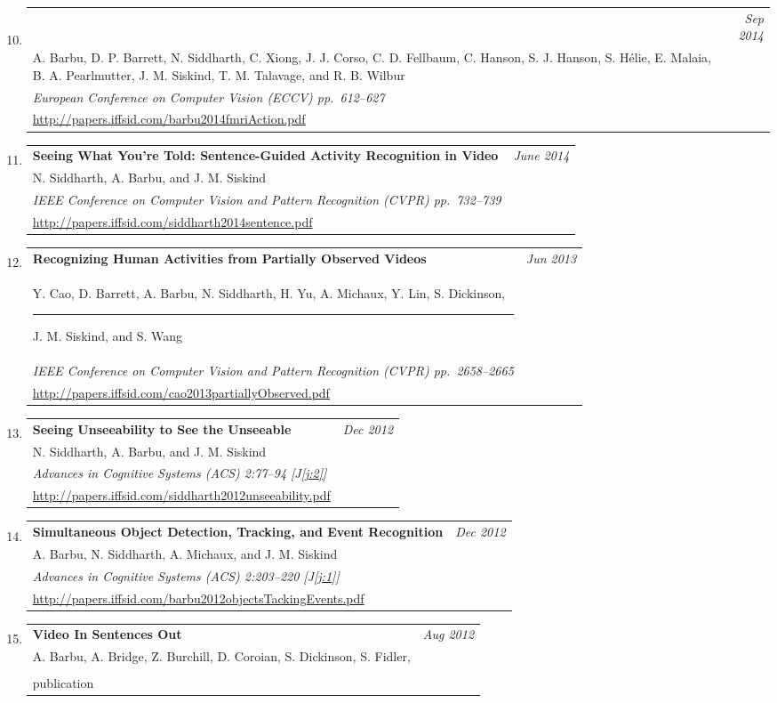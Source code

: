 \documentclass[10pt,a4paper]{article}
\makeatletter
\newcommand{\lbar}[1]{}
\newenvironment{benumerate}[2]{
    \let\oldItem\item
    \def\item{\addtocounter{enumi}{-2}\oldItem}
    \begin{enumerate}[#2]
    \setcounter{enumi}{#1}
    \addtocounter{enumi}{1}}
  {\end{enumerate}}
\newenvironment{publication}[5]
{ \item
  \begin{tabular*}{6.5in}{p{5.3in}@{\extracolsep{\fill}}r}
    \textbf{#1} & \textit{#2}\\ #3 &\\ \textit{#4}&\\ #5
  \end{tabular*}
} {}
\newenvironment{region}[3]{%
  \vspace*{0.5ex}
  {\scalebox{1.4}{\textbf{#1}}}
  \begin{benumerate}{#3}{\color{RoyalBlue}#2}}
  {\end{benumerate}\vspace{1ex}}
\makeatother
\begin{document}
\begin{region} {\lbar{purple}Refereed Conference Publications}{{C}1}{9}
  \begin{publication} {Seeing is \emph{Worse} than Believing: Reading People’s Minds
      Better than\rule{10ex}{0pt} Computer-Vision Methods Recognize Actions}
    {Sep 2014}
    {A. Barbu, D. P. Barrett, N. Siddharth, C. Xiong, J. J. Corso, C. D. Fellbaum,
      C. Hanson, S. J. Hanson, S. H\'elie, E. Malaia, B. A. Pearlmutter,
      J. M. Siskind, T. M. Talavage, and R. B. Wilbur}
    {European Conference on Computer Vision (ECCV) \hfill \emph{pp.~612--627}}
    {\url{http://papers.iffsid.com/barbu2014fmriAction.pdf}}
  \end{publication}
  \begin{publication} {Seeing What You're Told: Sentence-Guided Activity Recognition in Video}
    {June 2014}
    {N. Siddharth, A. Barbu, and J. M. Siskind}
    {IEEE Conference on Computer Vision and Pattern Recognition (CVPR) \hfill \emph{pp.~732--739}}
    {\url{http://papers.iffsid.com/siddharth2014sentence.pdf}}
  \end{publication}
  \begin{publication} {Recognizing Human Activities from Partially Observed Videos}
    {Jun 2013}
    {Y. Cao, D. Barrett, A. Barbu, N. Siddharth, H. Yu, A. Michaux, Y. Lin,
      S. Dickinson, \rule{6ex}{0pt} J. M. Siskind, and S. Wang}
    {IEEE Conference on Computer Vision and Pattern Recognition (CVPR) \hfill \emph{pp.~2658--2665}}
    {\url{http://papers.iffsid.com/cao2013partiallyObserved.pdf}}
  \end{publication}
  \begin{publication} {Seeing Unseeability to See the Unseeable}
    {Dec 2012}
    {N. Siddharth, A. Barbu, and J. M. Siskind}
    {Advances in Cognitive Systems (ACS) \hfill \emph{2:77--94} [{\color{RoyalBlue}J\ref{j:2}}]}
    {\url{http://papers.iffsid.com/siddharth2012unseeability.pdf}}
  \end{publication}
  \begin{publication} {Simultaneous Object Detection, Tracking, and Event Recognition}
    {Dec 2012}
    {A. Barbu, N. Siddharth, A. Michaux, and J. M. Siskind}
    {Advances in Cognitive Systems (ACS) \hfill \emph{2:203--220} [{\color{RoyalBlue}J\ref{j:1}}]}
    {\url{http://papers.iffsid.com/barbu2012objectsTackingEvents.pdf}}
  \end{publication}
  \begin{publication} {Video In Sentences Out}
    {Aug 2012}
    {A. Barbu, A. Bridge, Z. Burchill, D. Coroian, S. Dickinson, S. Fidler,
}
\end{publication}
\end{region}
\end{document}
